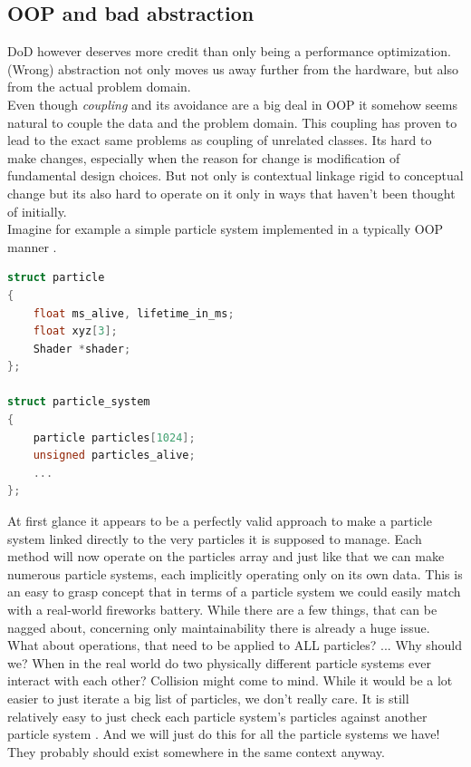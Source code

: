 \subsection{OOP and bad abstraction}\label{oop_bad_abstraction}
DoD however deserves more credit than only being a performance optimization. (Wrong) abstraction not only moves us away further from the hardware, but also from the actual problem domain.\\
Even though \textit{coupling} and its avoidance are a big deal in OOP it somehow seems natural to couple the data and the problem domain. This coupling has proven to lead to the exact same problems as coupling of unrelated classes. Its hard to make changes, especially when the reason for change is modification of fundamental design choices. But not only is contextual linkage rigid to conceptual change but its also hard to operate on it only in ways that haven't been thought of initially.\\
Imagine for example a simple particle system implemented in a typically OOP manner .
 \begin{lstlisting}[language=C++,numbers=none,name={OOP typical particle system implementation},label={particle_system}]
struct particle
{
	float ms_alive, lifetime_in_ms;
	float xyz[3];
	Shader *shader;
};

struct particle_system
{
	particle particles[1024];
	unsigned particles_alive;
	...
};
\end{lstlisting}
At first glance it appears to be a perfectly valid approach to make a particle system linked directly to the very particles it is supposed to manage. Each method will now operate on the particles array and just like that we can make numerous particle systems, each implicitly operating only on its own data. This is an easy to grasp concept that in terms of a particle system we could easily match with a real-world fireworks battery. While there are a few things, that can be nagged about, concerning only maintainability there is already a huge issue.\\
What about operations, that need to be applied to ALL particles? ... Why should we? When in the real world do two physically different particle systems ever interact with each other? Collision might come to mind. While it would be a lot easier to just iterate a big list of particles, we don't really care. It is still relatively easy to just check each particle system's particles against another particle system . And we will just do this for all the particle systems we have! They probably should exist somewhere in the same context anyway.\\
